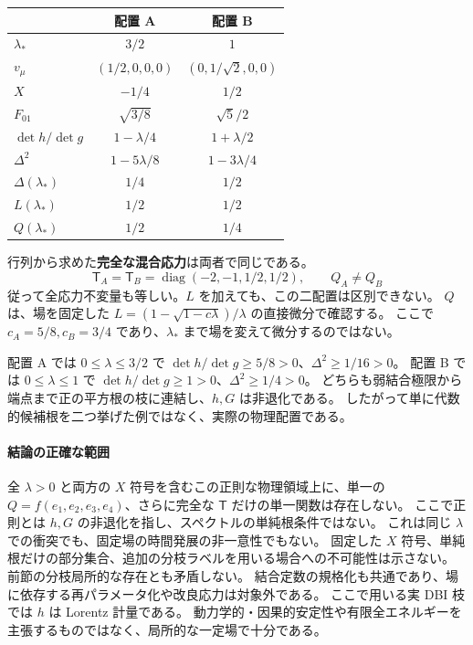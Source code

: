 \documentclass[11pt,a4paper]{article}
\newcommand{\Tmix}{\mathsf T}
\begin{document}
\begin{center}
\renewcommand{\arraystretch}{1.3}
\begin{tabular}{@{}lcc@{}}
\toprule
 & 配置 A & 配置 B\\
\midrule
$\lambda_*$ & $3/2$ & $1$\\
$v_\mu$ & $(1/2,0,0,0)$ & $(0,1/\sqrt2,0,0)$\\
$X$ & $-1/4$ & $1/2$\\
$F_{01}$ & $\sqrt{3/8}$ & $\sqrt5/2$\\
$\det h/\det g$ & $1-\lambda/4$ & $1+\lambda/2$\\
$\Delta^2$ & $1-5\lambda/8$ & $1-3\lambda/4$\\
$\Delta(\lambda_*)$ & $1/4$ & $1/2$\\
$L(\lambda_*)$ & $1/2$ & $1/2$\\
$Q(\lambda_*)$ & $1/2$ & $1/4$\\
\bottomrule
\end{tabular}
\end{center}

行列から求めた\textbf{完全な混合応力}は両者で同じである。
\begin{equation}\label{eq:same-T}
\Tmix_A=\Tmix_B=\operatorname{diag}(-2,-1,1/2,1/2),\qquad Q_A\ne Q_B
\end{equation}
従って全応力不変量も等しい。$L$ を加えても、この二配置は区別できない。
$Q$ は、場を固定した $L=(1-\sqrt{1-c\lambda})/\lambda$ の直接微分で確認する。
ここで $c_A=5/8,c_B=3/4$ であり、$\lambda_*$ まで場を変えて微分するのではない。

配置 A では $0\leq\lambda\leq3/2$ で
$\det h/\det g\geq5/8>0$、$\Delta^2\geq1/16>0$。
配置 B では $0\leq\lambda\leq1$ で
$\det h/\det g\geq1>0$、$\Delta^2\geq1/4>0$。
どちらも弱結合極限から端点まで正の平方根の枝に連結し、$h,G$ は非退化である。
したがって単に代数的候補根を二つ挙げた例ではなく、実際の物理配置である。

\paragraph{結論の正確な範囲}
全 $\lambda>0$ と両方の $X$ 符号を含むこの正則な物理領域上に、単一の
$Q=f(e_1,e_2,e_3,e_4)$、さらに完全な $\Tmix$ だけの単一関数は存在しない。
ここで正則とは $h,G$ の非退化を指し、スペクトルの単純根条件ではない。
これは同じ $\lambda$ での衝突でも、固定場の時間発展の非一意性でもない。
固定した $X$ 符号、単純根だけの部分集合、追加の分枝ラベルを用いる場合への不可能性は示さない。
前節の分枝局所的な存在とも矛盾しない。
結合定数の規格化も共通であり、場に依存する再パラメータ化や改良応力は対象外である。
ここで用いる実 DBI 枝では $h$ は Lorentz 計量である。
動力学的・因果的安定性や有限全エネルギーを主張するものではなく、局所的な一定場で十分である。
\end{document}
